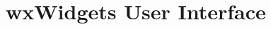 \chapter{wxWidgets User Interface}

\newpage

\newpage

\newpage

\newpage

\newpage

\newpage


\newpage

\newpage

\newpage

\newpage

